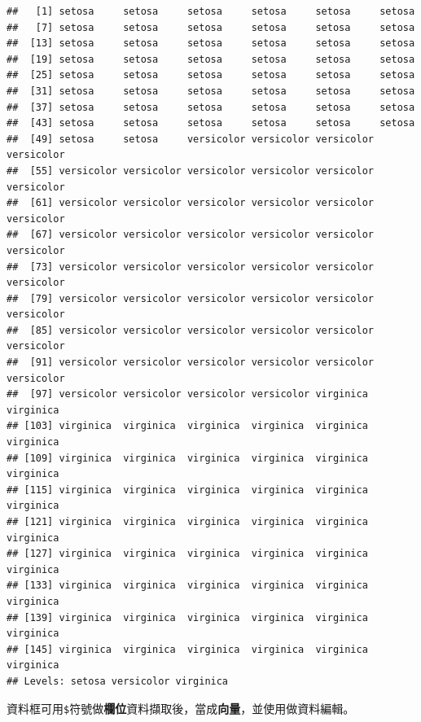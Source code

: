 \documentclass[]{book}
\newenvironment{Shaded}{\begin{snugshade}}{\end{snugshade}}
\newcommand{\KeywordTok}[1]{\textcolor[rgb]{0.13,0.29,0.53}{\textbf{{#1}}}}
\newcommand{\DecValTok}[1]{\textcolor[rgb]{0.00,0.00,0.81}{{#1}}}
\newcommand{\StringTok}[1]{\textcolor[rgb]{0.31,0.60,0.02}{{#1}}}
\newcommand{\NormalTok}[1]{{#1}}
\theoremstyle{definition}
\theoremstyle{definition}
\theoremstyle{remark}
\begin{document}
\begin{verbatim}
##   [1] setosa     setosa     setosa     setosa     setosa     setosa    
##   [7] setosa     setosa     setosa     setosa     setosa     setosa    
##  [13] setosa     setosa     setosa     setosa     setosa     setosa    
##  [19] setosa     setosa     setosa     setosa     setosa     setosa    
##  [25] setosa     setosa     setosa     setosa     setosa     setosa    
##  [31] setosa     setosa     setosa     setosa     setosa     setosa    
##  [37] setosa     setosa     setosa     setosa     setosa     setosa    
##  [43] setosa     setosa     setosa     setosa     setosa     setosa    
##  [49] setosa     setosa     versicolor versicolor versicolor versicolor
##  [55] versicolor versicolor versicolor versicolor versicolor versicolor
##  [61] versicolor versicolor versicolor versicolor versicolor versicolor
##  [67] versicolor versicolor versicolor versicolor versicolor versicolor
##  [73] versicolor versicolor versicolor versicolor versicolor versicolor
##  [79] versicolor versicolor versicolor versicolor versicolor versicolor
##  [85] versicolor versicolor versicolor versicolor versicolor versicolor
##  [91] versicolor versicolor versicolor versicolor versicolor versicolor
##  [97] versicolor versicolor versicolor versicolor virginica  virginica 
## [103] virginica  virginica  virginica  virginica  virginica  virginica 
## [109] virginica  virginica  virginica  virginica  virginica  virginica 
## [115] virginica  virginica  virginica  virginica  virginica  virginica 
## [121] virginica  virginica  virginica  virginica  virginica  virginica 
## [127] virginica  virginica  virginica  virginica  virginica  virginica 
## [133] virginica  virginica  virginica  virginica  virginica  virginica 
## [139] virginica  virginica  virginica  virginica  virginica  virginica 
## [145] virginica  virginica  virginica  virginica  virginica  virginica 
## Levels: setosa versicolor virginica
\end{verbatim}

資料框可用\texttt{\$}符號做\textbf{欄位}資料擷取後，當成\textbf{向量}，並使用\textbf{\protect\hyperlink{preface}{}}做資料編輯。

\begin{Shaded}
\end{Shaded}
\end{document}

